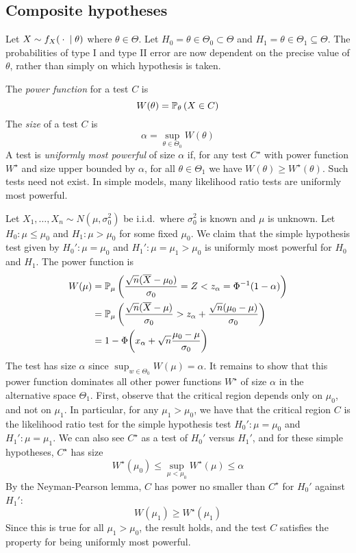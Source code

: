 \subsection{Composite hypotheses}
Let \( X \sim f_X({}\cdot{} \mid \theta) \) where \( \theta \in \Theta \).
Let \( H_0 = \theta \in \Theta_0 \subset \Theta \) and \( H_1 = \theta \in \Theta_1 \subseteq \Theta \).
The probabilities of type I and type II error are now dependent on the precise value of \( \theta \), rather than simply on which hypothesis is taken.
\begin{definition}
	The \textit{power function} for a test \( C \) is
	\[
		W(\theta) = \mathbb{P}_{\theta}\left({X \in C}\right)
	\]
	The \textit{size} of a test \( C \) is
	\[
		\alpha = \sup_{\theta \in \Theta_0} W(\theta)
	\]
	A test is \textit{uniformly most powerful} of size \( \alpha \) if, for any test \( C^\star \) with power function \( W^\star \) and size upper bounded by \( \alpha \), for all \( \theta \in \Theta_1 \) we have \( W(\theta) \geq W^\star(\theta) \).
	Such tests need not exist.
	In simple models, many likelihood ratio tests are uniformly most powerful.
\end{definition}
\begin{example}
	Let \( X_1, \dots, X_n \sim N(\mu, \sigma_0^2) \) be i.i.d.\ where \( \sigma_0^2 \) is known and \( \mu \) is unknown.
	Let \( H_0 \colon \mu \leq \mu_0 \) and \( H_1 \colon \mu > \mu_0 \) for some fixed \( \mu_0 \).
	We claim that the simple hypothesis test given by \( H_0' \colon \mu = \mu_0 \) and \( H_1' \colon \mu = \mu_1 > \mu_0 \) is uniformly most powerful for \( H_0 \) and \( H_1 \).
	The power function is
	\begin{align*}
		W(\mu) & = \mathbb{P}_{\mu}\left({\frac{\sqrt{n}(\overline X-\mu_0)}{\sigma_0} = Z < z_\alpha = \Phi^{-1}(1-\alpha)}\right)                \\
		       & = \mathbb{P}_{\mu}\left({\frac{\sqrt{n}(\overline X - \mu)}{\sigma_0} > z_\alpha + \frac{\sqrt{n}(\mu_0 - \mu)}{\sigma_0}}\right) \\
		       & = 1 - \Phi\qty(x_\alpha + \sqrt{n} \frac{\mu_0 - \mu}{\sigma_0})
	\end{align*}
	The test has size \( \alpha \) since \( \sup_{w \in \Theta_0} W(\mu) = \alpha \).
	It remains to show that this power function dominates all other power functions \( W^\star \) of size \( \alpha \) in the alternative space \( \Theta_1 \).
	First, observe that the critical region depends only on \( \mu_0 \), and not on \( \mu_1 \).
	In particular, for any \( \mu_1 > \mu_0 \), we have that the critical region \( C \) is the likelihood ratio test for the simple hypothesis test \( H_0' \colon \mu = \mu_0 \) and \( H_1' \colon \mu = \mu_1 \).
	We can also see \( C^\star \) as a test of \( H_0' \) versus \( H_1' \), and for these simple hypotheses, \( C^\star \) has size
	\[
		W^\star(\mu_0) \leq \sup_{\mu < \mu_0} W^\star(\mu) \leq \alpha
	\]
	By the Neyman-Pearson lemma, \( C \) has power no smaller than \( C^\star \) for \( H_0' \) against \( H_1' \):
	\[
		W(\mu_1) \geq W^\star(\mu_1)
	\]
	Since this is true for all \( \mu_1 > \mu_0 \), the result holds, and the test \( C \) satisfies the property for being uniformly most powerful.
\end{example}

